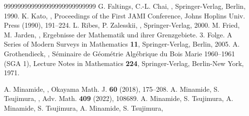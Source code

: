 \begin{thebibliography}{999999999999999999999999999}
   G. Faltings, C.-L. Chai, , Springer-Verlag, Berlin, 1990. 
   K. Kato, , Proceedings of the First JAMI Conference, Johns Hoplins Univ. Press (1990), 191--224.
   L. Ribes, P. Zalesskii, , Springer-Verlag, 2000.
   M. Fried, M. Jarden, , Ergebnisse der Mathematik und ihrer Grenzgebiete. 3. Folge. A Series of Modern Surveys in Mathematics \textbf{11}, Springer-Verlag, Berlin, 2005.
   A. Grothendieck, , S\'eminaire de G\'eom\'etrie Alg\'ebrique du Bois Marie 1960--1961 (SGA 1), Lecture Notes in Mathematics \textbf{224}, Springer-Verlag, Berlin-New York, 1971.

   A. Minamide, , Okayama Math. J. \textbf{60} (2018), 175--208.
   A. Minamide, S. Tsujimura, , Adv. Math. \textbf{409} (2022), 108689.
   A. Minamide, S. Tsujimura, 
   A. Minamide, S. Tsujimura,
   A. Minamide, S. Tsujimura, 
\end{thebibliography}
